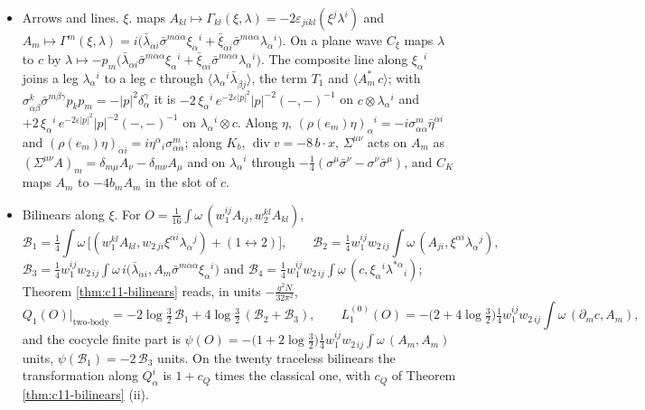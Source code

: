 \begin{remark}
\begin{itemize}
\item Arrows and lines. $\xi.$ maps $A_{kl}\mapsto\Gamma_{kl}(\xi,\lambda)=-2\varepsilon_{jikl}(\xi^j\lambda^i)$ and $A_m\mapsto\Gamma^m(\xi,\lambda)=i\big(\bar\lambda_{\dot\alpha i}\bar\sigma^{m\dot\alpha\alpha}\xi_\alpha{}^i+\bar\xi_{\dot\alpha i}\bar\sigma^{m\dot\alpha\alpha}\lambda_\alpha{}^i\big)$. On a plane wave $C_\xi$ maps $\lambda$ to $c$ by $\lambda\mapsto-p_m\big(\bar\lambda_{\dot\alpha i}\bar\sigma^{m\dot\alpha\alpha}\xi_\alpha{}^i+\bar\xi_{\dot\alpha i}\bar\sigma^{m\dot\alpha\alpha}\lambda_\alpha{}^i\big)$. The composite line along $\xi_\alpha{}^i$ joins a leg $\lambda_\alpha{}^i$ to a leg $c$ through $\langle\lambda_\alpha{}^i\bar\lambda_{\dot\beta j}\rangle$, the term $T_1$ and $\langle A^*_m\,c\rangle$; with $\sigma^k_{\alpha\dot\beta}\bar\sigma^{m\dot\beta\gamma}p_kp_m=-|p|^2\delta_\alpha^\gamma$ it is $-2\,\xi_\alpha{}^i\,e^{-2\varepsilon|p|^2}|p|^{-2}(-,-)^{-1}$ on $c\otimes\lambda_\alpha{}^i$ and $+2\,\xi_\alpha{}^i\,e^{-2\varepsilon|p|^2}|p|^{-2}(-,-)^{-1}$ on $\lambda_\alpha{}^i\otimes c$. Along $\eta$, $(\rho(e_m)\eta)_\alpha{}^i=-i\sigma^m_{\alpha\dot\alpha}\bar\eta^{\dot\alpha i}$ and $(\rho(e_m)\eta)_{\dot\alpha i}=i\eta^\alpha{}_i\sigma^m_{\alpha\dot\alpha}$; along $K_b$, $\operatorname{div}v=-8\,b\cdot x$, $\Sigma^{\mu\nu}$ acts on $A_m$ as $(\Sigma^{\mu\nu}A)_m=\delta_{m\mu}A_\nu-\delta_{m\nu}A_\mu$ and on $\lambda_\alpha{}^i$ through $-\tfrac14(\sigma^\mu\bar\sigma^\nu-\sigma^\nu\bar\sigma^\mu)$, and $C_K$ maps $A_m$ to $-4b_mA_m$ in the slot of $c$.
\item Bilinears along $\xi$. For $O=\tfrac1{16}\int\omega\,(w_1^{ij}A_{ij},w_2^{kl}A_{kl})$,
\[
\mathcal B_1=\tfrac14\int\omega\,\big[(w_1^{kl}A_{kl},w_{2\,ji}\xi^{\alpha i}\lambda_\alpha{}^j)+(1\leftrightarrow2)\big],\qquad \mathcal B_2=\tfrac14w_1^{ij}w_{2\,ij}\int\omega\,(A_{ji},\xi^{\alpha i}\lambda_\alpha{}^j),
\]
$\mathcal B_3=\tfrac14w_1^{ij}w_{2\,ij}\int\omega\,i\big(\bar\lambda_{\dot\alpha i},A_m\bar\sigma^{m\dot\alpha\alpha}\xi_\alpha{}^i\big)$ and $\mathcal B_4=\tfrac14w_1^{ij}w_{2\,ij}\int\omega\,(c,\xi_\alpha{}^i\lambda^{*\alpha}{}_i)$; Theorem \ref{thm:c11-bilinears} reads, in units $-\frac{g^2N}{32\pi^2}$,
\[
Q_1(O)\big|_{\text{two-body}}=-2\log\tfrac32\,\mathcal B_1+4\log\tfrac32\,(\mathcal B_2+\mathcal B_3),\qquad L_1^{(0)}(O)=-\big(2+4\log\tfrac32\big)\tfrac14w_1^{ij}w_{2\,ij}\int\omega\,(\partial_mc,A_m),
\]
and the cocycle finite part is $\psi(O)=-\big(1+2\log\tfrac32\big)\tfrac14w_1^{ij}w_{2\,ij}\int\omega\,(A_m,A_m)$ units, $\psi(\mathcal B_1)=-2\,\mathcal B_3$ units. On the twenty traceless bilinears the transformation along $Q^i_\alpha$ is $1+c_Q$ times the classical one, with $c_Q$ of Theorem \ref{thm:c11-bilinears} (ii).

\end{itemize}
\end{remark}
